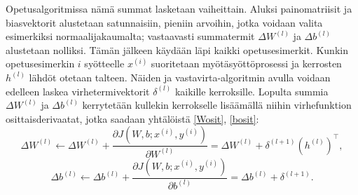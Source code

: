 \documentclass[12pt,a4paper,finnish,oneside,titlepage]{article}
\theoremstyle{plain}
\theoremstyle{definition}
\theoremstyle{remark}
\begin{document}
Opetusalgoritmissa nämä summat lasketaan vaiheittain. Aluksi painomatriisit ja biasvektorit alustetaan satunnaisiin, pieniin arvoihin, jotka voidaan valita esimerkiksi normaalijakaumalta; vastaavasti summatermit \(\Delta W^{(l)}\) ja \(\Delta b^{(l)}\) alustetaan nolliksi. Tämän jälkeen käydään läpi kaikki opetusesimerkit. Kunkin opetusesimerkin \(i\) syötteelle \(x^{(i)}\) suoritetaan myötäsyöttöprosessi ja kerrosten \(h^{(l)}\) lähdöt otetaan talteen. Näiden ja vastavirta-algoritmin avulla voidaan edelleen laskea virhetermivektorit \(\delta^{(l)}\) kaikille kerroksille. Lopulta summia \(\Delta W^{(l)}\) ja \(\Delta b^{(l)}\) kerrytetään kullekin kerrokselle lisäämällä niihin virhefunktion osittaisderivaatat, jotka saadaan yhtälöistä \ref{Wosit}, \ref{bosit}: \[\Delta W^{(l)}\leftarrow \Delta W^{(l)}+\frac{\partial J(W, b; x^{(i)}, y^{(i)})}{\partial W^{(l)}}=\Delta W^{(l)}+\delta^{(l+1)}(h^{(l)})^{\top},\]
\[\Delta b^{(l)}\leftarrow \Delta b^{(l)}+\frac{\partial J(W, b; x^{(i)}, y^{(i)})}{\partial b^{(l)}}=\Delta b^{(l)}+\delta^{(l+1)}.\]
\end{document}
